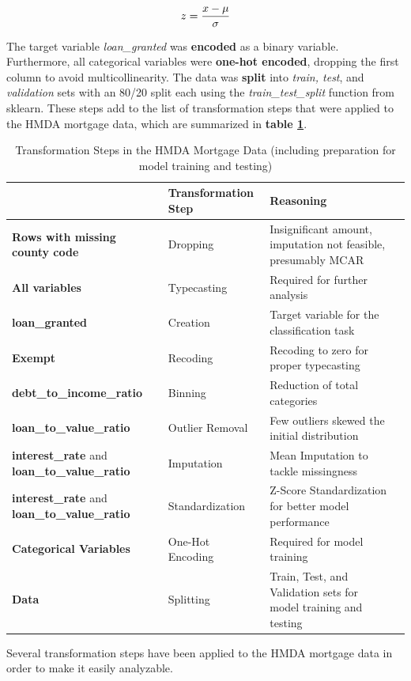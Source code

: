 \begin{equation}
    z = \frac{x - \mu}{\sigma}
    \label{eq:Z-Score Standardization}
    \addcontentsline{frm}{formulas}{\protect\numberline{\theequation}\hspace{1em}Z-Score Standardization}
\end{equation}

The target variable \textit{loan\_granted} was \textbf{encoded} as a binary variable. Furthermore, all categorical variables were \textbf{one-hot encoded}, dropping the first column to avoid multicollinearity.
The data was \textbf{split} into \textit{train, test}, and \textit{validation} sets with an 80/20 split each using the \textit{train\_test\_split} function from sklearn.
These steps add to the list of transformation steps that were applied to the HMDA mortgage data, which are summarized in \textbf{table \ref{tab:HMDA_transformation_summary_2}}.

\begin{table}[h]
    \centering
    \begin{tabularx}{\textwidth}{l *{3}{>{\centering\arraybackslash}X}}
    \hline
     & \textbf{Transformation Step} & \textbf{Reasoning} \\
    \hline
    \textbf{Rows with missing county code} & Dropping & Insignificant amount, imputation not feasible, presumably MCAR \\
    \textbf{All variables} & Typecasting & Required for further analysis \\
    \textbf{loan\_granted} & Creation & Target variable for the classification task \\
    \textbf{Exempt} & Recoding & Recoding to zero for proper typecasting \\
    \textbf{debt\_to\_income\_ratio} & Binning & Reduction of total categories \\
    \textbf{loan\_to\_value\_ratio} & Outlier Removal & Few outliers skewed the initial distribution \\
    \textbf{interest\_rate} and \textbf{loan\_to\_value\_ratio} & Imputation & Mean Imputation to tackle missingness \\
    \textbf{interest\_rate} and \textbf{loan\_to\_value\_ratio} & Standardization & Z-Score Standardization for better model performance \\
    \textbf{Categorical Variables} & One-Hot Encoding & Required for model training \\
    \textbf{Data} & Splitting & Train, Test, and Validation sets for model training and testing \\
    \hline
    \end{tabularx}
    \caption{Transformation Steps in the HMDA Mortgage Data (including preparation for model training and testing)}
    \small
    Several transformation steps have been applied to the HMDA mortgage data in order to make it easily analyzable.
    \label{tab:HMDA_transformation_summary_2}
\end{table}

